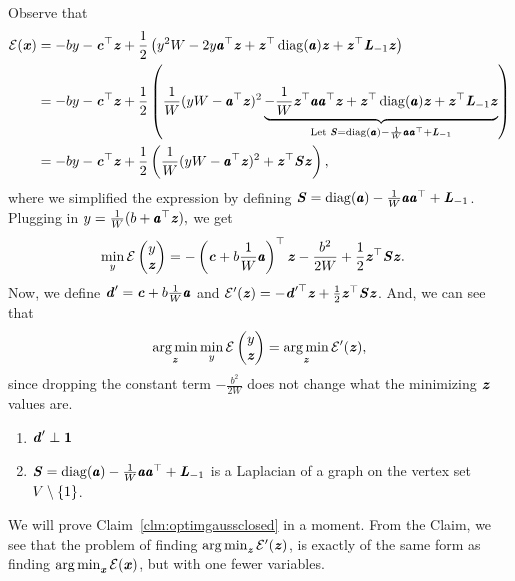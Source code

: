 Observe that
\begin{align*}
  \energy(\xx)
  &=
    - by  -\cc^\trp\zz
    +
    \frac{1}{2}
    \left(
    y^2 W - 2 y \aa^\trp \zz
    +
    \zz^\trp \diag(\aa) \zz
    +
    \zz^\trp \LL_{-1} \zz
    \right)
  \\* %
  &=
  - by  -\cc^\trp\zz
    +
    \frac{1}{2}
    \left(
    \frac{1}{W}( yW - \aa^\trp \zz )^2
    \underbrace{
    -
    \frac{1}{W}\zz^\trp \aa\aa^\trp \zz
    +
    \zz^\trp \diag(\aa) \zz
    +
    \zz^\trp \LL_{-1} \zz
    }_{\text{Let } \SS = \diag(\aa) - \frac{1}{W}\aa\aa^\trp +\LL_{-1}  }
    \right)
  \\* %
  &=
  - by  -\cc^\trp\zz
    +
    \frac{1}{2}
    \left(
    \frac{1}{W}( yW - \aa^\trp \zz )^2
    +
    \zz^\trp\SS \zz
    \right),
\end{align*}
where we simplified the expression by defining $\boldsymbol{\mathit{S}} = \operatorname*{diag}(\pmb{\mathit{a}}) -
\frac{1}{W}\pmb{\mathit{a}}\pmb{\mathit{a}}^\top +\boldsymbol{\mathit{L}}_{-1}$.
Plugging in ${y = \frac{1}{W}(b + \pmb{\mathit{a}}^\top \boldsymbol{\mathit{z}}),}$
we get
\begin{align*}
  \min_{y}
  \mathcal{E}
  \begin{pmatrix}
  y \\ \boldsymbol{\mathit{z}}
\end{pmatrix}
  &=
  -\left(\boldsymbol{\mathit{c}} +  b \frac{1}{W}\pmb{\mathit{a}} \right)^\top\boldsymbol{\mathit{z}}
    -
    \frac{b^2}{2W}
    +
    \frac{1}{2}
    \boldsymbol{\mathit{z}}^\top\boldsymbol{\mathit{S}} \boldsymbol{\mathit{z}}
    .
\end{align*}
Now, we define $\boldsymbol{\mathit{d}}' = \boldsymbol{\mathit{c}} +  b \frac{1}{W}\pmb{\mathit{a}}$
and $  \mathcal{E}'(\boldsymbol{\mathit{z}}) =
-\boldsymbol{\mathit{d}}'^\top\boldsymbol{\mathit{z}} +
\frac{1}{2}\boldsymbol{\mathit{z}}^\top\boldsymbol{\mathit{S}}\boldsymbol{\mathit{z}}$.
And, we can see that
\begin{align*}
  \operatorname*{arg\,min}_{\boldsymbol{\mathit{z}}} \min_{y}
  \mathcal{E}
  \begin{pmatrix}
  y \\ \boldsymbol{\mathit{z}}
\end{pmatrix}
  =
\operatorname*{arg\,min}_{\boldsymbol{\mathit{z}}}
    \mathcal{E}'(\boldsymbol{\mathit{z}}),
\end{align*}
since dropping the constant term $    -
    \frac{b^2}{2W}$ does not change what the minimizing $\boldsymbol{\mathit{z}}$ values
    are.
\begin{claim}
\label{clm:optimgaussclosed}
\noindent
  \begin{enumerate}
  \item $ \boldsymbol{\mathit{d}}' \perp \boldsymbol{1}$
  \item $ \boldsymbol{\mathit{S}} = \operatorname*{diag}(\pmb{\mathit{a}}) - \frac{1}{W}\pmb{\mathit{a}}\pmb{\mathit{a}}^\top +\boldsymbol{\mathit{L}}_{-1} $ is a
    Laplacian of a graph on the vertex set $V\setminus\left\{1 \right\}$.
  \end{enumerate}
\end{claim}
We will prove Claim~\ref{clm:optimgaussclosed} in a moment.
From the Claim, we see that the problem of finding $\operatorname*{arg\,min}_{\boldsymbol{\mathit{z}}}
    \mathcal{E}'(\boldsymbol{\mathit{z}})$, is exactly of the same form as finding $\operatorname*{arg\,min}_{\boldsymbol{\mathit{x}}}
    \mathcal{E}(\boldsymbol{\mathit{x}})$, but with one fewer variables.


